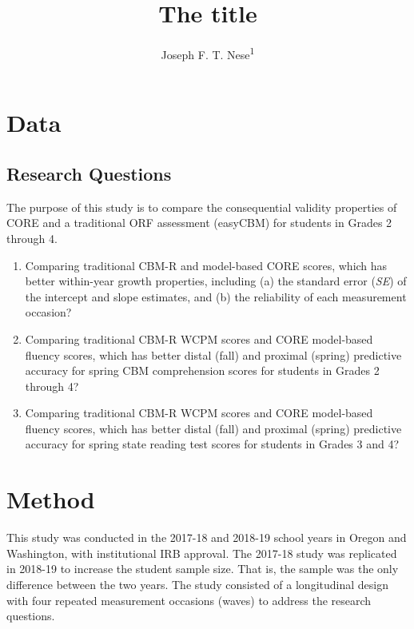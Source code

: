 \documentclass[
  english,
  man, fleqn, noextraspace]{apa6}
\title{The title}
\author{Joseph F. T. Nese\textsuperscript{1}}
\date{}
\affiliation{\vspace{0.5cm}\textsuperscript{1} University of Oregon}
\begin{document}
\maketitle

\hypertarget{data}{%
\section{Data}\label{data}}

\hypertarget{research-questions}{%
\subsection{Research Questions}\label{research-questions}}

The purpose of this study is to compare the consequential validity properties of CORE and a traditional ORF assessment (easyCBM) for students in Grades 2 through 4.

\begin{enumerate}
\def\labelenumi{(\arabic{enumi})}
\item
  Comparing traditional CBM-R and model-based CORE scores, which has better within-year growth properties, including (a) the standard error (\emph{SE}) of the intercept and slope estimates, and (b) the reliability of each measurement occasion?
\item
  Comparing traditional CBM-R WCPM scores and CORE model-based fluency scores, which has better distal (fall) and proximal (spring) predictive accuracy for spring CBM comprehension scores for students in Grades 2 through 4?
\item
  Comparing traditional CBM-R WCPM scores and CORE model-based fluency scores, which has better distal (fall) and proximal (spring) predictive accuracy for spring state reading test scores for students in Grades 3 and 4?
\end{enumerate}

\hypertarget{method}{%
\section{Method}\label{method}}

This study was conducted in the 2017-18 and 2018-19 school years in Oregon and Washington, with institutional IRB approval. The 2017-18 study was replicated in 2018-19 to increase the student sample size. That is, the sample was the only difference between the two years. The study consisted of a longitudinal design with four repeated measurement occasions (waves) to address the research questions.
\end{document}
